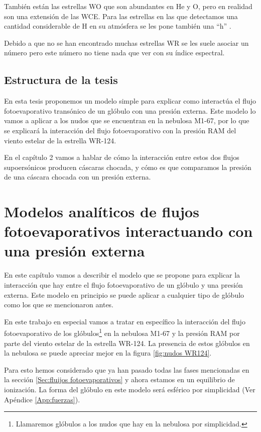 \documentclass{book}
\begin{document}
También están las estrellas WO que son abundantes en He y O, pero en realidad son una extensión de las WCE. Para las estrellas en las que detectamos una cantidad considerable de H en su atmósfera se les pone también una ``h'' \citep{SSM:1996}.

Debido a que no se han encontrado muchas estrellas WR se les suele asociar un número pero este número no tiene nada que ver con su índice espectral.

\section{Estructura de la tesis}

En esta tesis proponemos un modelo simple para explicar como interactúa el flujo fotoevaporativo transónico de un glóbulo con una presión externa. Este modelo lo vamos a aplicar  a los nudos que se encuentran en la nebulosa M1-67, por lo que se explicará la interacción del flujo fotoevaporativo con la presión RAM del viento estelar de la estrella WR-124.

En el capítulo 2 vamos a hablar de cómo la interacción entre estos dos flujos supoersónicos producen cáscaras chocada, y cómo es que comparamos la presión de una cáscara chocada con un presión externa. 

\chapter{Modelos analíticos de flujos fotoevaporativos interactuando con una presión externa}
\label{Chapter : Modelo}

En este capítulo vamos a describir el modelo que se propone para explicar la interacción que hay entre el flujo fotoevaporativo de un glóbulo y una presión externa. Este modelo en principio se puede aplicar a cualquier tipo de glóbulo como los que se mencionaron antes. 

En este trabajo en especial vamos a tratar en específico la interacción del flujo fotoevaporativo de los glóbulos\footnote{Llamaremos glóbulos a los nudos que hay en la nebulosa por simplicidad.} en la nebulosa M1-67 y la presión RAM por parte del viento estelar de la estrella WR-124. La presencia de estos glóbulos en la nebulosa se puede apreciar mejor en la figura \ref{fig:nudos WR124}.

Para esto hemos considerado que ya han pasado todas las fases mencionadas en la sección \ref{Sec:fluijos fotoevaporativos} y ahora estamos en un equilibrio de ionización. La forma del glóbulo en este modelo será esférico por simplicidad (Ver Apéndice \ref{App:fuerzas}).
\end{document}
